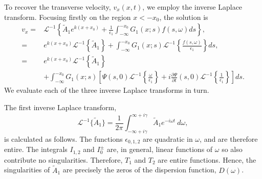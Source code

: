 \documentclass[12pt]{../style-files/ociamthesis}
\begin{document}
To recover the transverse velocity, $v_x(x, t)$, we employ the inverse Laplace transform. Focusing firstly on the region $x < -x_0$, the solution is
\newcommand{\e}{\epsilon}
\begin{align}
v_x =& \mathcal{L}^{-1} \left\{ \tilde{A}_1 e^{k(x+x_0)} + \frac{1}{\e_1} \int_{-\infty}^{-x_0} G_1(x;s)f(s, \omega)ds \right\}, \\
=& e^{k(x+x_0)} \mathcal{L}^{-1}\left\{ \tilde{A}_1 \right\} + \int_{-\infty}^{-x_0} G_1(x;s) \mathcal{L}^{-1}\left\{ \frac{f(s, \omega)}{\e_1} \right\} ds, \\
=& e^{k(x+x_0)} \mathcal{L}^{-1}\left\{ \tilde{A}_1 \right\} \\
& + \int_{-\infty}^{-x_0} G_1(x;s) \left[ \Psi (s, 0) \mathcal{L}^{-1}\left\{ \frac{\omega}{\e_1} \right\} + i \frac{\partial \Psi}{\partial t}(s, 0) \mathcal{L}^{-1}\left\{ \frac{1}{\e_1} \right\}\right] ds.
\label{sol incomp}
\end{align}
We evaluate each of the three inverse Laplace transforms in turn.

The first inverse Laplace transform,
\begin{equation}
\mathcal{L}^{-1} \{\tilde{A}_1\} = \frac{1}{2\pi} \int_{-\infty + i\gamma}^{\infty + i\gamma} \tilde{A}_1 e^{-i\omega t} ~d\omega,
\end{equation}
is calculated as follows. The functions $\epsilon_{0,1,2}$ are quadratic in $\omega$, and are therefore entire. The integrals $I_{1,2}$ and $I_0^\pm$ are, in general, linear functions of $\omega$ so also contribute no singularities. Therefore, $T_1$ and $T_2$ are entire functions. Hence, the singularities of $\tilde{A}_1$ are precisely the zeros of the dispersion function, $D(\omega)$.
\end{document}
